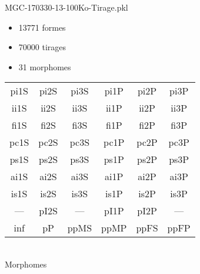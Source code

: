 MGC-170330-13-100Ko-Tirage.pkl
\begin{itemize}
\item 13771 formes
\item 70000 tirages
\item 31 morphomes
\end{itemize}
\begin{center}
\begin{tabular}{cccccc}
\hline
\cellcolor{white}pi1S & \cellcolor{orange}pi2S & \cellcolor{orange}pi3S & \cellcolor{white}pi1P & \cellcolor{white}pi2P & \cellcolor{white}pi3P\\
\cellcolor{brown}ii1S & \cellcolor{brown}ii2S & \cellcolor{brown}ii3S & \cellcolor{white}ii1P & \cellcolor{white}ii2P & \cellcolor{brown}ii3P\\
\cellcolor{yellow}fi1S & \cellcolor{lime}fi2S & \cellcolor{lime}fi3S & \cellcolor{green}fi1P & \cellcolor{white}fi2P & \cellcolor{green}fi3P\\
\cellcolor{yellow}pc1S & \cellcolor{yellow}pc2S & \cellcolor{yellow}pc3S & \cellcolor{white}pc1P & \cellcolor{white}pc2P & \cellcolor{yellow}pc3P\\
\cellcolor{teal}ps1S & \cellcolor{teal}ps2S & \cellcolor{teal}ps3S & \cellcolor{white}ps1P & \cellcolor{white}ps2P & \cellcolor{teal}ps3P\\
\cellcolor{white}ai1S & \cellcolor{lightgray}ai2S & \cellcolor{lightgray}ai3S & \cellcolor{white}ai1P & \cellcolor{pink}ai2P & \cellcolor{white}ai3P\\
\cellcolor{pink}is1S & \cellcolor{pink}is2S & \cellcolor{lightgray}is3S & \cellcolor{pink}is1P & \cellcolor{black}is2P & \cellcolor{pink}is3P\\
--- & \cellcolor{white}pI2S & --- & \cellcolor{white}pI1P & \cellcolor{white}pI2P & ---\\
\cellcolor{white}inf & \cellcolor{white}pP & \cellcolor{white}ppMS & \cellcolor{white}ppMP & \cellcolor{white}ppFS & \cellcolor{white}ppFP\\
\hline
\end{tabular}\\
Morphomes
\end{center}
\bigskip

